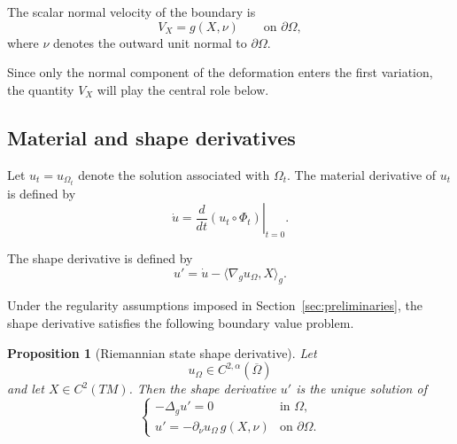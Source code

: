 \documentclass{article}
\newtheorem{proposition}[theorem]{Proposition}
\begin{document}
The scalar normal velocity of the boundary is
\begin{equation}
V_X
=
g(X,\nu)
\qquad\text{on }\partial\Omega,
\label{eq:normal-velocity}
\end{equation}
where $\nu$ denotes the outward unit normal to $\partial\Omega$.

Since only the normal component of the deformation enters the first
variation, the quantity $V_X$ will play the central role below.


\subsection{Material and shape derivatives}
\label{subsec:material-shape}

Let $u_t=u_{\Omega_t}$ denote the solution associated with $\Omega_t$.
The material derivative of $u_t$ is defined by
\begin{equation}
\dot u
=
\left.
\frac{d}{dt}
\left(
u_t\circ\Phi_t
\right)
\right|_{t=0}.
\label{eq:material-derivative}
\end{equation}

The shape derivative is defined by
\begin{equation}
u'
=
\dot u-\langle\nabla_g u_\Omega,X\rangle_g.
\label{eq:shape-derivative-state}
\end{equation}

Under the regularity assumptions imposed in
Section~\ref{sec:preliminaries}, the shape derivative satisfies the
following boundary value problem.

\begin{proposition}[Riemannian state shape derivative]
\label{prop:state-shape-derivative}
Let
\[
u_\Omega\in C^{2,\alpha}(\overline{\Omega})
\]
and let $X\in C^2(TM)$. Then the shape derivative $u'$ is the unique
solution of
\begin{equation}
\begin{cases}
-\Delta_g u'=0 & \text{in }\Omega,\\[2mm]
u'=-\partial_\nu u_\Omega\,g(X,\nu)
& \text{on }\partial\Omega.
\end{cases}
\label{eq:shape-derivative-PDE}
\end{equation}
\end{proposition}
\end{document}
